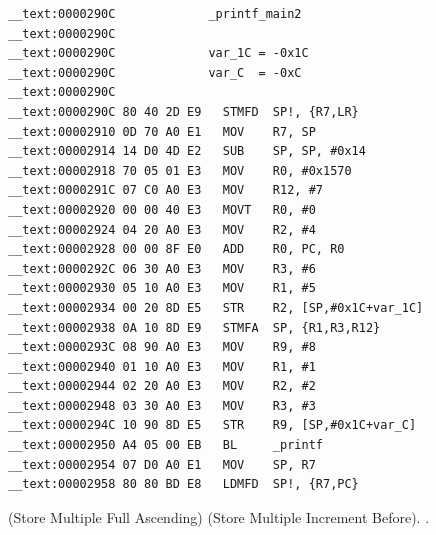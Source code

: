 \begin{lstlisting}
__text:0000290C             _printf_main2
__text:0000290C
__text:0000290C             var_1C = -0x1C
__text:0000290C             var_C  = -0xC
__text:0000290C
__text:0000290C 80 40 2D E9   STMFD  SP!, {R7,LR}
__text:00002910 0D 70 A0 E1   MOV    R7, SP
__text:00002914 14 D0 4D E2   SUB    SP, SP, #0x14
__text:00002918 70 05 01 E3   MOV    R0, #0x1570
__text:0000291C 07 C0 A0 E3   MOV    R12, #7
__text:00002920 00 00 40 E3   MOVT   R0, #0
__text:00002924 04 20 A0 E3   MOV    R2, #4
__text:00002928 00 00 8F E0   ADD    R0, PC, R0
__text:0000292C 06 30 A0 E3   MOV    R3, #6
__text:00002930 05 10 A0 E3   MOV    R1, #5
__text:00002934 00 20 8D E5   STR    R2, [SP,#0x1C+var_1C]
__text:00002938 0A 10 8D E9   STMFA  SP, {R1,R3,R12}
__text:0000293C 08 90 A0 E3   MOV    R9, #8
__text:00002940 01 10 A0 E3   MOV    R1, #1
__text:00002944 02 20 A0 E3   MOV    R2, #2
__text:00002948 03 30 A0 E3   MOV    R3, #3
__text:0000294C 10 90 8D E5   STR    R9, [SP,#0x1C+var_C]
__text:00002950 A4 05 00 EB   BL     _printf
__text:00002954 07 D0 A0 E1   MOV    SP, R7
__text:00002958 80 80 BD E8   LDMFD  SP!, {R7,PC}
\end{lstlisting}

%
%
  (Store Multiple Full Ascending)%
%
 (Store Multiple Increment Before)\ES{}. 
%
.

